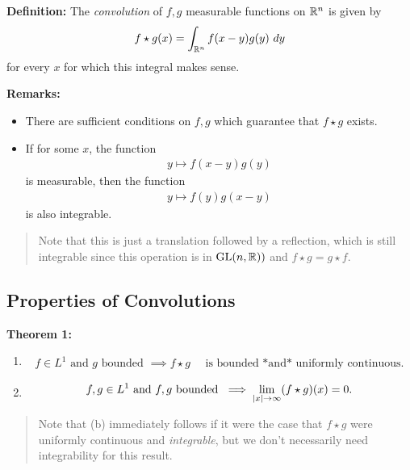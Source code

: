 \textbf{Definition:} The \emph{convolution} of \(f,g\) measurable
functions on \({\mathbb{R}}^n\) is given by
\begin{align*}
f\star g (x) = \int_{{\mathbb{R}}^n} f(x-y) g(y) ~dy
\end{align*} for every \(x\) for which this integral makes sense.

\textbf{Remarks:}

\begin{itemize}
\item
  There are sufficient conditions on \(f,g\) which guarantee that
  \(f\star g\) exists.
\item
  If for some \(x\), the function
  \begin{align*}
  y\mapsto f(x-y)g(y)
  \end{align*} is measurable, then the function
  \begin{align*}
  y\mapsto f(y)g(x-y)
  \end{align*} is also integrable.
\end{itemize}

\begin{quote}
Note that this is just a translation followed by a reflection, which is
still integrable since this operation is in \({\text{GL}}(n, {\mathbb{R}}))\) and
\(f\star g = g \star f\).
\end{quote}

\hypertarget{properties-of-convolutions}{%
\subsection{Properties of
Convolutions}\label{properties-of-convolutions}}

\textbf{Theorem 1:}

\begin{enumerate}
\def\labelenumi{\alph{enumi}.}
\tightlist
\item

  \begin{align*}
  f\in L^1 \text{ and } g \text{ bounded } \implies f\star g \quad \text{ is bounded  *and* uniformly continuous}.
  \end{align*}
\item

  \begin{align*}
  f,g \in L^1 \text{ and } f,g \text{ bounded } \implies \lim_{{\left\lvert {x} \right\rvert}\to\infty} (f\star g)(x) = 0
  .\end{align*}
\end{enumerate}

\begin{quote}
Note that (b) immediately follows if it were the case that \(f\star g\)
were uniformly continuous and \emph{integrable}, but we don't
necessarily need integrability for this result.
\end{quote}

